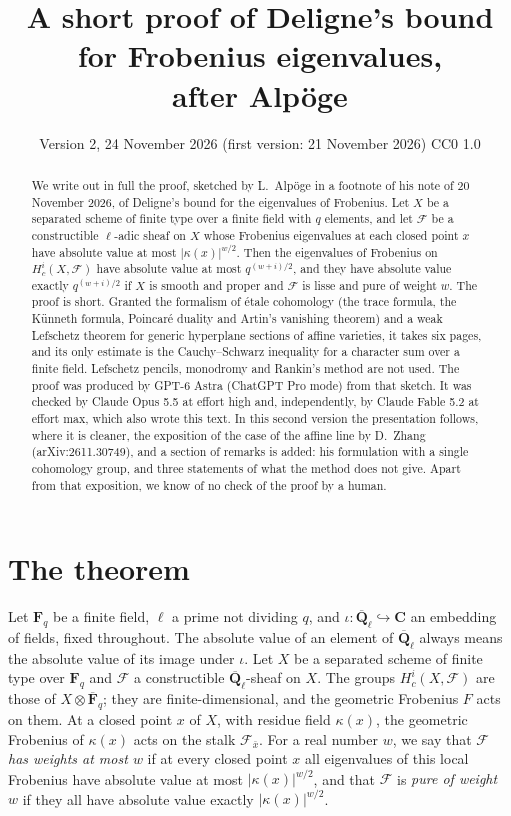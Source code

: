 \documentclass[11pt,a4paper]{article}
\title{A short proof of Deligne's bound for Frobenius eigenvalues,\\ after Alp\"oge}
\author{}
\date{Version 2, 24 November 2026 \quad (first version: 21 November 2026) \quad CC0 1.0}
\theoremstyle{plain}
\theoremstyle{remark}
\newcommand{\Fq}{\mathbf F_q}
\newcommand{\Fqb}{\overline{\mathbf F}_q}
\newcommand{\Ql}{\overline{\mathbf Q}_\ell}
\newcommand{\F}{\mathcal F}
\begin{document}
\maketitle

\begin{abstract}
\noindent
We write out in full the proof, sketched by L.~Alp\"oge in a footnote of his note of 20 November 2026, of Deligne's
bound for the eigenvalues of Frobenius. Let $X$ be a separated scheme of finite type over a finite field with $q$
elements, and let $\mathcal F$ be a constructible $\ell$-adic sheaf on $X$ whose Frobenius eigenvalues at each closed
point $x$ have absolute value at most $|\kappa(x)|^{w/2}$. Then the eigenvalues of Frobenius on $H^i_c(X,\mathcal F)$
have absolute value at most $q^{(w+i)/2}$, and they have absolute value exactly $q^{(w+i)/2}$ if $X$ is smooth and
proper and $\mathcal F$ is lisse and pure of weight $w$. The proof is short. Granted the formalism of \'etale
cohomology (the trace formula, the K\"unneth formula, Poincar\'e duality and Artin's vanishing theorem) and a weak
Lefschetz theorem for generic hyperplane sections of affine varieties, it takes six pages, and its only
estimate is the Cauchy--Schwarz inequality for a character sum over a finite field. Lefschetz pencils, monodromy and
Rankin's method are not used. The proof was produced by GPT-6 Astra (ChatGPT Pro mode) from that sketch. It was
checked by Claude Opus 5.5 at effort high and, independently, by Claude Fable 5.2 at effort max, which also wrote
this text. In this second version the presentation follows, where it is cleaner, the exposition of the case of the
affine line by D.~Zhang (arXiv:2611.30749), and a section of remarks is added: his formulation with a single
cohomology group, and three statements of what the method does not give. Apart from that exposition, we know of no
check of the proof by a human.
\end{abstract}

\section{The theorem}

Let $\Fq$ be a finite field, $\ell$ a prime not dividing $q$, and $\iota:\Ql\hookrightarrow\mathbf C$ an embedding of
fields, fixed throughout. The absolute value of an element of $\Ql$ always means the absolute value of its image
under $\iota$. Let $X$ be a separated scheme of finite type over $\Fq$ and $\F$ a constructible $\Ql$-sheaf on $X$.
The groups $H^i_c(X,\F)$ are those of $X\otimes\Fqb$; they are finite-dimensional, and the geometric Frobenius $F$
acts on them. At a closed point $x$ of $X$, with residue field $\kappa(x)$, the geometric Frobenius of $\kappa(x)$
acts on the stalk $\F_{\bar x}$. For a real number $w$, we say that $\F$ \emph{has weights at most $w$} if at every
closed point $x$ all eigenvalues of this local Frobenius have absolute value at most $|\kappa(x)|^{w/2}$, and that
$\F$ is \emph{pure of weight $w$} if they all have absolute value exactly $|\kappa(x)|^{w/2}$.
\end{document}
